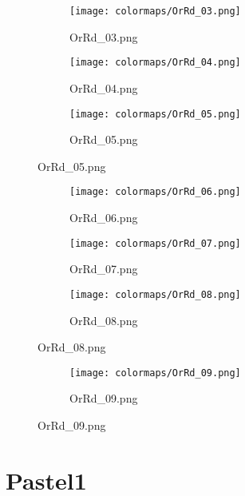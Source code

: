 \documentclass{article}%
\begin{document}
\begin{figure}[h!]%
\begin{subfigure}[b]{0.3\linewidth}%
\texttt{[image: colormaps/OrRd\_03.png]}%
\caption{OrRd\_03.png}%
\end{subfigure}%
\begin{subfigure}[b]{0.3\linewidth}%
\texttt{[image: colormaps/OrRd\_04.png]}%
\caption{OrRd\_04.png}%
\end{subfigure}%
\begin{subfigure}[b]{0.3\linewidth}%
\texttt{[image: colormaps/OrRd\_05.png]}%
\caption{OrRd\_05.png}%
\end{subfigure}%
\end{figure}

%
\hspace{1cm}\hfill%
\hspace{1cm}\hfill%
\hspace{1cm}\hfill%


\begin{figure}[h!]%
\begin{subfigure}[b]{0.3\linewidth}%
\texttt{[image: colormaps/OrRd\_06.png]}%
\caption{OrRd\_06.png}%
\end{subfigure}%
\begin{subfigure}[b]{0.3\linewidth}%
\texttt{[image: colormaps/OrRd\_07.png]}%
\caption{OrRd\_07.png}%
\end{subfigure}%
\begin{subfigure}[b]{0.3\linewidth}%
\texttt{[image: colormaps/OrRd\_08.png]}%
\caption{OrRd\_08.png}%
\end{subfigure}%
\end{figure}

%
\hspace{1cm}\hfill%


\begin{figure}[h!]%
\begin{subfigure}[b]{0.3\linewidth}%
\texttt{[image: colormaps/OrRd\_09.png]}%
\caption{OrRd\_09.png}%
\end{subfigure}%
\end{figure}

%
\newpage%
\section{Pastel1}%
\label{sec:Pastel1}%
\hspace{1cm}\hfill%
\hspace{1cm}\hfill%
\hspace{1cm}\hfill%
\end{document}
